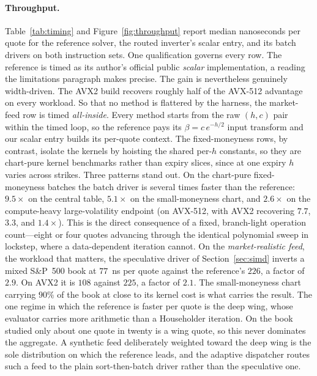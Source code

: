 \documentclass[11pt]{article}
\begin{document}
\paragraph{Throughput.}
Table~\ref{tab:timing} and Figure~\ref{fig:throughput} report median nanoseconds per quote for the reference solver, the routed inverter's scalar entry, and its batch drivers on both instruction sets. One qualification governs every row. The reference is timed as its author's official public \emph{scalar} implementation, a reading the limitations paragraph makes precise. The gain is nevertheless genuinely width-driven. The AVX2 build recovers roughly half of the AVX-512 advantage on every workload. So that no method is flattered by the harness, the market-feed row is timed \emph{all-inside}. Every method starts from the raw $(h,c)$ pair within the timed loop, so the reference pays its $\beta=c\,e^{-h/2}$ input transform and our scalar entry builds its per-quote context. The fixed-moneyness rows, by contrast, isolate the kernels by hoisting the shared per-$h$ constants, so they are chart-pure kernel benchmarks rather than expiry slices, since at one expiry $h$ varies across strikes. Three patterns stand out. On the chart-pure fixed-moneyness batches the batch driver is several times faster than the reference: $9.5\times$ on the central table, $5.1\times$ on the small-moneyness chart, and $2.6\times$ on the compute-heavy large-volatility endpoint (on AVX-512, with AVX2 recovering $7.7$, $3.3$, and $1.4\times$). This is the direct consequence of a fixed, branch-light operation count---eight or four quotes advancing through the identical polynomial sweep in lockstep, where a data-dependent iteration cannot. On the \emph{market-realistic feed}, the workload that matters, the speculative driver of Section~\ref{sec:simd} inverts a mixed S\&P~500 book at $77$~ns per quote against the reference's $226$, a factor of $2.9$. On AVX2 it is $108$ against $225$, a factor of $2.1$. The small-moneyness chart carrying $90\%$ of the book at close to its kernel cost is what carries the result. The one regime in which the reference is faster per quote is the deep wing, whose evaluator carries more arithmetic than a Householder iteration. On the book studied only about one quote in twenty is a wing quote, so this never dominates the aggregate. A synthetic feed deliberately weighted toward the deep wing is the sole distribution on which the reference leads, and the adaptive dispatcher routes such a feed to the plain sort-then-batch driver rather than the speculative one.
\end{document}
